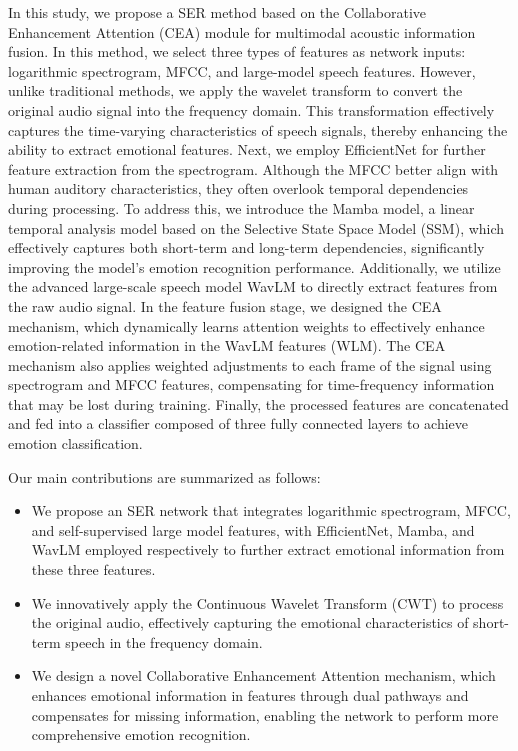 \documentclass[runningheads]{llncs}
\begin{document}
In this study, we propose a SER method based on the Collaborative Enhancement Attention (CEA) module for multimodal acoustic information fusion.  In this method, we select three types of features as network inputs: logarithmic spectrogram, MFCC, and large-model speech features. However, unlike traditional methods, we apply the wavelet transform to convert the original audio signal into the frequency domain. This transformation effectively captures the time-varying characteristics of speech signals, thereby enhancing the ability to extract emotional features.  Next, we employ EfficientNet for further feature extraction from the spectrogram. Although the MFCC better align with human auditory characteristics, they often overlook temporal dependencies during processing. To address this, we introduce the Mamba\cite{b17} model, a linear temporal analysis model based on the Selective State Space Model (SSM), which effectively captures both short-term and long-term dependencies, significantly improving the model's emotion recognition performance.  Additionally, we utilize the advanced large-scale speech model WavLM\cite{b13} to directly extract features from the raw audio signal. In the feature fusion stage, we designed the CEA mechanism, which dynamically learns attention weights to effectively enhance emotion-related information in the WavLM features (WLM). The CEA mechanism also applies weighted adjustments to each frame of the signal using spectrogram and MFCC features, compensating for time-frequency information that may be lost during training. Finally, the processed features are concatenated and fed into a classifier composed of three fully connected layers to achieve emotion classification.

Our main contributions are summarized as follows:
\begin{itemize}
\item We propose an SER network that integrates logarithmic spectrogram, MFCC, and self-supervised large model features, with EfficientNet, Mamba, and WavLM employed respectively to further extract emotional information from these three features.  
\item We innovatively apply the Continuous Wavelet Transform (CWT) to process the original audio, effectively capturing the emotional characteristics of short-term speech in the frequency domain.  
\item We design a novel Collaborative Enhancement Attention mechanism, which enhances emotional information in features through dual pathways and compensates for missing information, enabling the network to perform more comprehensive emotion recognition.
\end{itemize}
\end{document}
